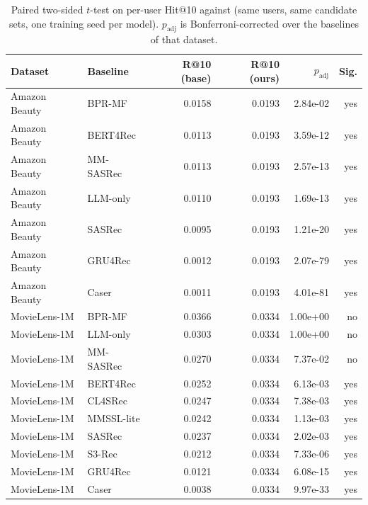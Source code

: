 \begin{table}[t]
\centering
\caption{Paired two-sided $t$-test on per-user Hit@10 against \model{} (same users, same candidate sets, one training seed per model). $p_{\mathrm{adj}}$ is Bonferroni-corrected over the baselines of that dataset.}
\label{tab:significance}
\small
\begin{tabular}{llrrrr}
\toprule
Dataset & Baseline & R@10 (base) & R@10 (ours) & $p_{\mathrm{adj}}$ & Sig. \\
\midrule
Amazon Beauty & BPR-MF & 0.0158 & 0.0193 & 2.84e-02 & yes \\
Amazon Beauty & BERT4Rec & 0.0113 & 0.0193 & 3.59e-12 & yes \\
Amazon Beauty & MM-SASRec & 0.0113 & 0.0193 & 2.57e-13 & yes \\
Amazon Beauty & LLM-only & 0.0110 & 0.0193 & 1.69e-13 & yes \\
Amazon Beauty & SASRec & 0.0095 & 0.0193 & 1.21e-20 & yes \\
Amazon Beauty & GRU4Rec & 0.0012 & 0.0193 & 2.07e-79 & yes \\
Amazon Beauty & Caser & 0.0011 & 0.0193 & 4.01e-81 & yes \\
\midrule
MovieLens-1M & BPR-MF & 0.0366 & 0.0334 & 1.00e+00 & no \\
MovieLens-1M & LLM-only & 0.0303 & 0.0334 & 1.00e+00 & no \\
MovieLens-1M & MM-SASRec & 0.0270 & 0.0334 & 7.37e-02 & no \\
MovieLens-1M & BERT4Rec & 0.0252 & 0.0334 & 6.13e-03 & yes \\
MovieLens-1M & CL4SRec & 0.0247 & 0.0334 & 7.38e-03 & yes \\
MovieLens-1M & MMSSL-lite & 0.0242 & 0.0334 & 1.13e-03 & yes \\
MovieLens-1M & SASRec & 0.0237 & 0.0334 & 2.02e-03 & yes \\
MovieLens-1M & S3-Rec & 0.0212 & 0.0334 & 7.33e-06 & yes \\
MovieLens-1M & GRU4Rec & 0.0121 & 0.0334 & 6.08e-15 & yes \\
MovieLens-1M & Caser & 0.0038 & 0.0334 & 9.97e-33 & yes \\
\bottomrule
\end{tabular}
\end{table}
